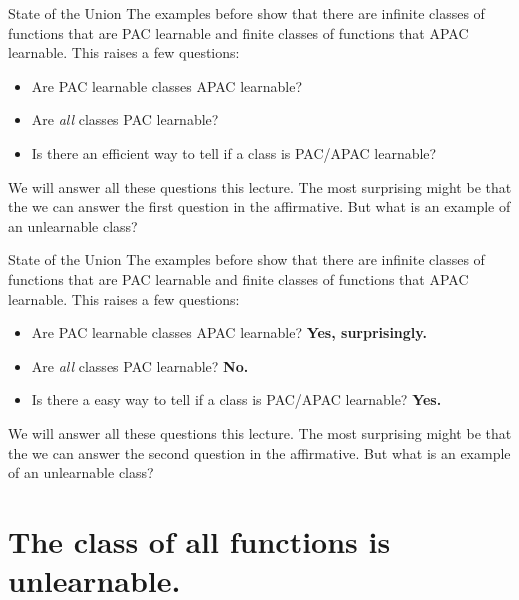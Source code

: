 \documentclass[10pt, table, dvipsnames, handout]{beamer}
\begin{document}
\begin{frame}[fragile]{State of the Union}
The examples before show that there are infinite classes of functions that are PAC learnable and finite classes of functions that APAC learnable. This raises a few questions:

\begin{itemize}
\item[] Are PAC learnable classes APAC learnable?\pause
\item[] Are \emph{all} classes PAC learnable?\pause
\item[] Is there an efficient way to tell if a class is PAC/APAC learnable?\pause
\end{itemize}
We will answer all these questions this lecture. \pause The most surprising might be that the we can answer the first question in the affirmative. {\color{white} But what is an example of an unlearnable class?}

\end{frame}



\begin{frame}[fragile]{State of the Union}
The examples before show that there are infinite classes of functions that are PAC learnable and finite classes of functions that APAC learnable. This raises a few questions:

\begin{itemize}
\item[] Are PAC learnable classes APAC learnable? \textbf{Yes, surprisingly.}
\item[] Are \emph{all} classes PAC learnable? \textbf{No.}
\item[] Is there a easy way to tell if a class is PAC/APAC learnable? \textbf{Yes.}
\end{itemize}
We will answer all these questions this lecture. The most surprising might be that the we can answer the second question in the affirmative. \pause  But what is an example of an unlearnable class?

\end{frame}



\section{The class of all functions is unlearnable.}
\end{document}
